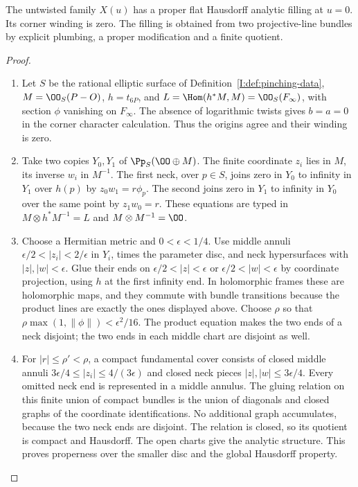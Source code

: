 \begin{theorem}\hypertarget{tag-02RA}{}\label{night:P2.10}\label{stmt:P2.10}

The untwisted family $X(u)$ has a proper flat Hausdorff analytic filling at $u=0$. Its corner winding is zero. The filling is obtained from two projective-line bundles by explicit plumbing, a proper modification and a finite quotient.
\end{theorem}
\begin{proof}
\begin{enumerate}[label=\arabic*.,leftmargin=*]
\item Let $S$ be the rational elliptic surface of Definition~\ref{I:def:pinching-data}, $M=\OO_S(P-O)$, $h=t_{6P}$, and $L=\Hom(h^*M,M)=\OO_S(F_\infty)$, with section $\phi$ vanishing on $F_\infty$. The absence of logarithmic twists gives $b=a=0$ in the corner character calculation. Thus the origins agree and their winding is zero. 

\item Take two copies $Y_0,Y_1$ of $\Pp_S(\OO\oplus M)$. The finite coordinate $z_i$ lies in $M$, its inverse $w_i$ in $M^{-1}$. The first neck, over $p\in S$, joins zero in $Y_0$ to infinity in $Y_1$ over $h(p)$ by $z_0w_1=r\phi_p$. The second joins zero in $Y_1$ to infinity in $Y_0$ over the same point by $z_1w_0=r$. These equations are typed in $M\otimes h^*M^{-1}=L$ and $M\otimes M^{-1}=\OO$.

\item Choose a Hermitian metric and $0<\epsilon<1/4$. Use middle annuli $\epsilon/2<|z_i|<2/\epsilon$ in $Y_i$, times the parameter disc, and neck hypersurfaces with $|z|,|w|<\epsilon$. Glue their ends on $\epsilon/2<|z|<\epsilon$ or $\epsilon/2<|w|<\epsilon$ by coordinate projection, using $h$ at the first infinity end. In holomorphic frames these are holomorphic maps, and they commute with bundle transitions because the product lines are exactly the ones displayed above. Choose $\rho$ so that $\rho\max(1,\|\phi\|)<\epsilon^2/16$. The product equation makes the two ends of a neck disjoint; the two ends in each middle chart are disjoint as well.

\item For $|r|\le\rho'<\rho$, a compact fundamental cover consists of closed middle annuli $3\epsilon/4\le|z_i|\le4/(3\epsilon)$ and closed neck pieces $|z|,|w|\le3\epsilon/4$. Every omitted neck end is represented in a middle annulus. The gluing relation on this finite union of compact bundles is the union of diagonals and closed graphs of the coordinate identifications. No additional graph accumulates, because the two neck ends are disjoint. The relation is closed, so its quotient is compact and Hausdorff. The open charts give the analytic structure. This proves properness over the smaller disc and the global Hausdorff property.


\end{enumerate}
\end{proof}
